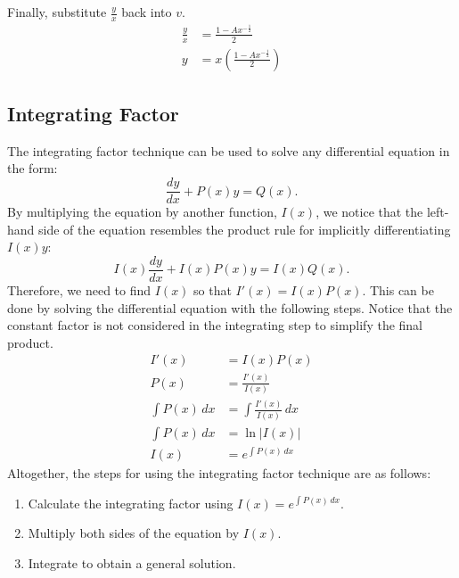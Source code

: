 \noindent Finally, substitute $\frac{y}{x}$ back into $v$.
\begin{align*}
	\frac{y}{x} &= \frac{1 - A x^{-\frac{1}{2}}}{2} \\[5pt]
	y &= x \left( \frac{1 - A x^{-\frac{1}{2}}}{2} \right)
\end{align*}

\subsection{Integrating Factor}
The integrating factor technique can be used to solve any differential equation in the form:
\[ \frac{dy}{dx} + P(x) y = Q(x). \]
By multiplying the equation by another function, $I(x)$, we notice that the left-hand side of the equation resembles the product rule for implicitly differentiating $I(x) y$:
\[ I(x) \frac{dy}{dx} + I(x) P(x)y = I(x) Q(x). \]
Therefore, we need to find $I(x)$ so that $I'(x) = I(x) P(x)$. This can be done by solving the differential equation with the following steps. Notice that the constant factor is not considered in the integrating step to simplify the final product.
\begin{align*}
	I'(x) &= I(x) P(x) \\
	P(x) &= \frac{I'(x)}{I(x)} \\[5pt]
	\int P(x) \, dx &= \int \frac{I'(x)}{I(x)} \, dx \\[5pt]
	\int P(x) \, dx &= \ln |I(x)| \\[5pt]
	I(x) &= e^{\int P(x) \, dx}
\end{align*}
Altogether, the steps for using the integrating factor technique are as follows:
\begin{enumerate}
	\item Calculate the integrating factor using $I(x) = e^{\int P(x) \, dx}$.
	\item Multiply both sides of the equation by $I(x)$.
	\item Integrate to obtain a general solution.
\end{enumerate}

